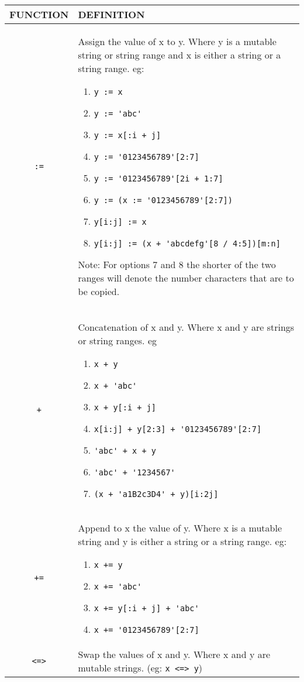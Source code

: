 \begin{tabular}{|c|p{}|}
\hline
FUNCTION& DEFINITION\\
  \hline
\verb':='& Assign the value of x to y. Where y is a mutable string  or
 string range and x is either a string or a string  range. eg:
 \begin{enumerate}
\item\verb'y := x'
\item\verb"y := 'abc'"
\item\verb'y := x[:i + j]'
\item\verb"y := '0123456789'[2:7]"
\item\verb"y := '0123456789'[2i + 1:7]"
\item\verb"y := (x := '0123456789'[2:7])"
\item\verb"y[i:j] := x"
\item\verb"y[i:j] := (x + 'abcdefg'[8 / 4:5])[m:n]"
\end{enumerate}

Note: For options 7 and 8 the shorter of the two ranges 
will denote the number characters that are to be copied.\\
\verb'+'&  Concatenation of x and y. Where x and y are strings or  
 string ranges. eg
 \begin{enumerate}
\item\verb"x + y"
\item\verb"x + 'abc'"
\item\verb"x + y[:i + j]"
\item\verb"x[i:j] + y[2:3] + '0123456789'[2:7]"
\item\verb"'abc' + x + y"
\item\verb"'abc' + '1234567'"
\item\verb"(x + 'a1B2c3D4' + y)[i:2j]"
\end{enumerate}\\
\verb'+='& Append to x the value of y. Where x is a mutable string 
and y is either a string or a string range. eg:
\begin{enumerate}
\item\verb"x += y"                  
\item\verb"x += 'abc'"              
\item\verb"x += y[:i + j] + 'abc'"
\item\verb"x += '0123456789'[2:7]"
\end{enumerate}
\\
\verb'<=>'&  Swap the values of x and y. Where x and y are mutable   
            strings.  (eg: \verb'x <=> y')\\
  \hline
\end{tabular}

